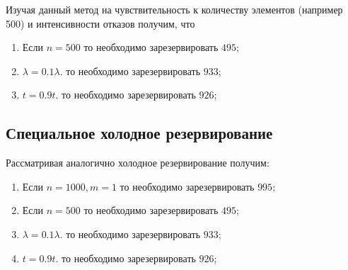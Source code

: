 	Изучая данный метод на чувствительность к количеству элементов (например 500) и интенсивности отказов получим, что
	\begin{enumerate}
		\item Если $n = 500$ то необходимо зарезервировать $495$;
		\item $\lambda = 0.1\lambda$. то необходимо зарезервировать $933$;
		\item $t = 0.9t$. то необходимо зарезервировать $926$;
	\end{enumerate}

\subsection{Специальное холодное резервирование}
	Рассматривая аналогично холодное резервирование получим:
	\begin{enumerate}
		\item Если $n = 1000, m = 1$ то необходимо зарезервировать $995$;
		\item Если $n = 500$ то необходимо зарезервировать $495$;
		\item $\lambda = 0.1\lambda$. то необходимо зарезервировать $933$;
		\item $t = 0.9t$. то необходимо зарезервировать $926$;
	\end{enumerate}
